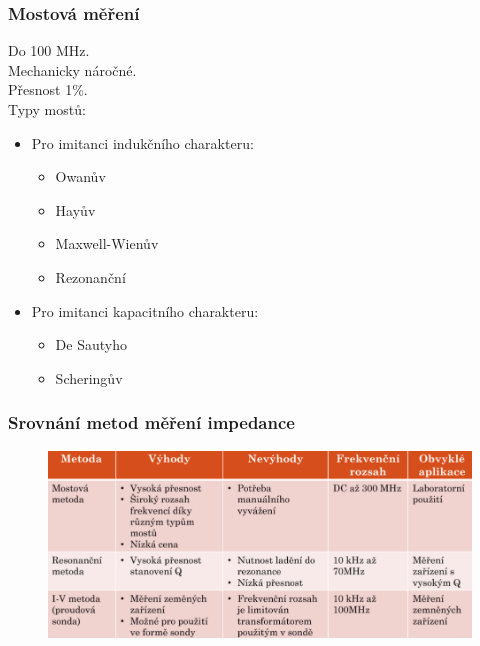 \subsubsection{Mostová měření}
Do 100 MHz. \\
Mechanicky náročné.\\
Přesnost 1\%.\\
Typy mostů:
\begin{itemize}
    \item Pro imitanci indukčního charakteru:
          \begin{itemize}
              \item Owanův
              \item Hayův
              \item Maxwell-Wienův
              \item Rezonanční
          \end{itemize}
    \item Pro imitanci kapacitního charakteru:
          \begin{itemize}
              \item De Sautyho
              \item Scheringův
          \end{itemize}
\end{itemize}

\subsubsection{Srovnání metod měření impedance}


\begin{figure}[h!]
    \centering
    \includegraphics[scale = 0.4]{images/srovnani.png}
\end{figure}

